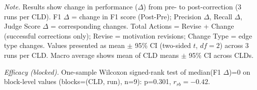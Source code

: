 \begin{table}[H]
\centering
\begin{minipage}{\linewidth}
\centering
\caption{Corrector Performance on Ground Truth Data Using Correctness-Based Validation (Baseline Prompt)}
\label{tab:rq1b_groundtruth_correctness}
\begin{threeparttable}
\end{threeparttable}
\vspace{0.5em}
\footnotesize
\textit{Note.} Results show change in performance ($\Delta$) from pre- to post-correction (3 runs per CLD).
F1 $\Delta$ = change in F1 score (Post-Pre); Precision $\Delta$, Recall $\Delta$, Judge Score $\Delta$ = corresponding changes.
Total Actions = Revise + Change (successful corrections only); Revise = motivation revisions; Change Type = edge type changes.
Values presented as mean $\pm$ 95\% CI (two-sided $t$, $df=2$) across 3 runs per CLD. Macro average shows mean of CLD means $\pm$ 95\% CI across CLDs.\par
\textit{Efficacy (blocked).} One-sample Wilcoxon signed-rank test of median(F1 $\Delta$)=0 on block-level values (blocks=(CLD, run), n=9): p=0.301, $r_{rb}=-0.42$.

\end{minipage}
\end{table}
